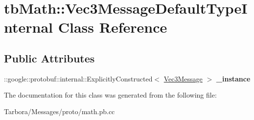 \hypertarget{classtbMath_1_1Vec3MessageDefaultTypeInternal}{}\section{tb\+Math\+:\+:Vec3\+Message\+Default\+Type\+Internal Class Reference}
\label{classtbMath_1_1Vec3MessageDefaultTypeInternal}
\subsection*{Public Attributes}
\begin{DoxyCompactItemize}
\item 
\mbox{\label{classtbMath_1_1Vec3MessageDefaultTypeInternal_a55bfcdf4e685d15bf1965505fe4f8349}} 
\+::google\+::protobuf\+::internal\+::\+Explicitly\+Constructed$<$ \hyperlink{classtbMath_1_1Vec3Message}{Vec3\+Message} $>$ {\bfseries \+\_\+instance}
\end{DoxyCompactItemize}


The documentation for this class was generated from the following file\+:\begin{DoxyCompactItemize}
\item 
Tarbora/\+Messages/proto/math.\+pb.\+cc\end{DoxyCompactItemize}
